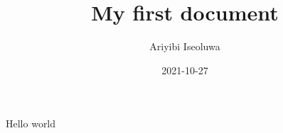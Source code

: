 \documentclass{article}
\title{My first document}
\date{2021-10-27}
\author{Ariyibi Iseoluwa}
\begin{document}
	\maketitle
	\newpage
	Hello world
\end{document}
